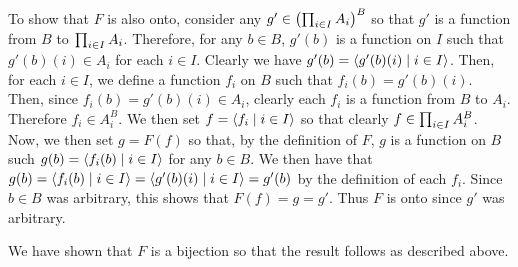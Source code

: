 {{    To show that $F$ is also onto, consider any $g' \in \left( \prod_{i \in I} A_i \right)^B$ so that $g'$ is a function from $B$ to $\prod_{i \in I} A_i$.
    Therefore, for any $b \in B$, $g'(b)$ is a function on $I$ such that $g'(b)(i) \in A_i$ for each $i \in I$.
    Clearly we have $g'(b) = \left\langle g'(b)(i) \mid i \in I \right\rangle$.
    Then, for each $i \in I$, we define a function $f_i$ on $B$ such that $f_i(b) = g'(b)(i)$.
    Then, since $f_i(b) = g'(b)(i) \in A_i$, clearly each $f_i$ is a function from $B$ to $A_i$.
    Therefore $f_i \in A_i^B$.
    We then set $f = \left\langle f_i \mid i \in I \right\rangle$ so that clearly $f \in \prod_{i \in I} A_i^B$.
    Now, we then set $g = F(f)$ so that, by the definition of $F$, $g$ is a function on $B$ such $g(b) = \left\langle f_i(b) \mid i \in I \right\rangle$ for any $b \in B$.
    We then have that $g(b) = \left\langle f_i(b) \mid i \in I \right\rangle = \left\langle g'(b)(i) \mid i \in I \right\rangle = g'(b)$ by the definition of each $f_i$.
    Since $b \in B$ was arbitrary, this shows that $F(f) = g = g'$.
    Thus $F$ is onto since $g'$ was arbitrary.

    We have shown that $F$ is a bijection so that the result follows as described above.
  }
}

